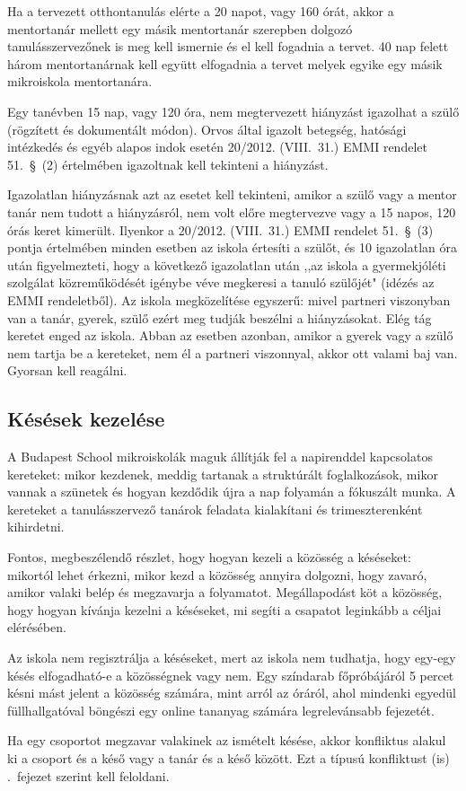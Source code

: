Ha a tervezett otthontanulás elérte a 20 napot, vagy 160 órát, akkor a mentortanár mellett egy másik mentortanár szerepben dolgozó tanulásszervezőnek is meg kell ismernie és el kell fogadnia a tervet. 40 nap felett három mentortanárnak kell együtt elfogadnia a tervet melyek egyike egy másik mikroiskola mentortanára.

Egy tanévben 15 nap, vagy 120 óra, nem megtervezett hiányzást igazolhat a szülő (rögzített és dokumentált módon). Orvos által igazolt betegség, hatósági intézkedés és egyéb alapos indok esetén 20/2012. (VIII.~31.) EMMI rendelet 51.~§~(2) értelmében igazoltnak kell tekinteni a hiányzást.

Igazolatlan hiányzásnak azt az esetet kell tekinteni, amikor a szülő vagy a mentor tanár nem tudott a hiányzásról, nem volt előre megtervezve vagy a 15 napos, 120 órás keret kimerült. Ilyenkor a 20/2012. (VIII.~31.) EMMI rendelet 51.~§~(3) pontja értelmében minden esetben az iskola értesíti a szülőt, és 10 igazolatlan óra után figyelmezteti, hogy a következő igazolatlan után ,,az iskola a gyermekjóléti szolgálat közreműködését igénybe véve megkeresi a tanuló szülőjét" (idézés az EMMI rendeletből). Az iskola megközelítése egyszerű: mivel partneri viszonyban van a tanár, gyerek, szülő ezért meg tudják beszélni a hiányzásokat. Elég tág keretet enged az iskola. Abban az esetben azonban, amikor a gyerek vagy a szülő nem tartja be a kereteket, nem él a partneri viszonnyal, akkor ott valami baj van. Gyorsan kell reagálni.

\subsection{Késések kezelése}
A Budapest School mikroiskolák maguk állítják fel a napirenddel kapcsolatos kereteket: mikor kezdenek, meddig tartanak a struktúrált foglalkozások, mikor vannak a szünetek és hogyan kezdődik újra a nap folyamán a fókuszált munka. A kereteket a tanulásszervező tanárok feladata kialakítani és trimeszterenként kihirdetni.

Fontos, megbeszélendő részlet, hogy hogyan kezeli a közösség a késéseket: mikortól lehet érkezni, mikor kezd a közösség annyira dolgozni, hogy zavaró, amikor valaki belép és megzavarja a folyamatot. Megállapodást köt a közösség, hogy hogyan kívánja kezelni a késéseket, mi segíti a csapatot leginkább a céljai elérésében.

Az iskola nem regisztrálja a késéseket, mert az iskola nem tudhatja, hogy egy-egy késés elfogadható-e a közösségnek vagy nem. Egy színdarab főpróbájáról 5 percet késni mást jelent a közösség számára, mint arról az óráról, ahol mindenki egyedül füllhallgatóval böngészi egy online tananyag számára legrelevánsabb fejezetét.

Ha egy csoportot megzavar valakinek az ismételt késése, akkor konfliktus alakul ki a csoport és a késő vagy a tanár és a késő között. Ezt a típusú konfliktust (is) .~fejezet szerint kell feloldani.